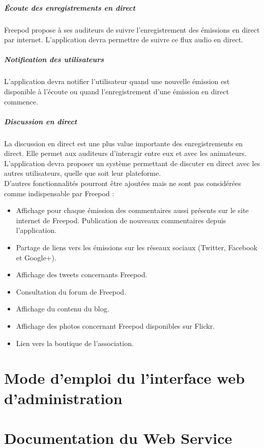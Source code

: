 \documentclass[11pt, french]{report}
\begin{document}
\paragraph{Écoute des enregistrements en direct}
Freepod propose à ses auditeurs de suivre l’enregistrement des émissions en direct par internet. L’application devra permettre de suivre ce flux audio en direct.

\paragraph{Notification des utilisateurs}
L’application devra notifier l’utilisateur quand une nouvelle émission est disponible à l’écoute ou quand l’enregistrement d’une émission en direct commence.

\paragraph{Discussion en direct}
La discussion en direct est une plus value importante des enregistrements en direct. Elle permet aux auditeurs d'interagir entre eux et avec les animateurs. L’application devra proposer un système permettant de discuter en direct avec les autres utilisateurs, quelle que soit leur plateforme.\\

D’autres fonctionnalités pourront être ajoutées mais ne sont pas considérées comme indispensable par Freepod :
\begin{itemize}
\item Affichage pour chaque émission des commentaires aussi présents sur le site internet de Freepod. Publication de nouveaux commentaires depuis l’application.
\item Partage de liens vers les émissions sur les réseaux sociaux (Twitter, Facebook et Google+).
\item Affichage des tweets concernants Freepod.
\item Consultation du forum de Freepod.
\item Affichage du contenu du blog.
\item Affichage des photos concernant Freepod disponibles sur Flickr.
\item Lien vers la boutique de l’association.
\end{itemize}

\chapter{Mode d'emploi du l'interface web d'administration}




\chapter{Documentation du Web Service}





\nocite{*}

\end{document}
